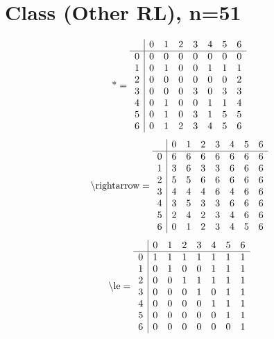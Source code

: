 \documentclass[11pt]{article}
\begin{document}
\section{Class (Other RL), n=51}
\[\text{*} = 
\begin{array}{r | r r r r r r r}
 & 0 & 1 & 2 & 3 & 4 & 5 & 6 \\ \hline
0 & 0 & 0 & 0 & 0 & 0 & 0 & 0 \\
1 & 0 & 1 & 0 & 0 & 1 & 1 & 1 \\
2 & 0 & 0 & 0 & 0 & 0 & 0 & 2 \\
3 & 0 & 0 & 0 & 3 & 0 & 3 & 3 \\
4 & 0 & 1 & 0 & 0 & 1 & 1 & 4 \\
5 & 0 & 1 & 0 & 3 & 1 & 5 & 5 \\
6 & 0 & 1 & 2 & 3 & 4 & 5 & 6 \\
\end{array}
\]
\[\text{\textbackslash rightarrow} = 
\begin{array}{r | r r r r r r r}
 & 0 & 1 & 2 & 3 & 4 & 5 & 6 \\ \hline
0 & 6 & 6 & 6 & 6 & 6 & 6 & 6 \\
1 & 3 & 6 & 3 & 3 & 6 & 6 & 6 \\
2 & 5 & 5 & 6 & 6 & 6 & 6 & 6 \\
3 & 4 & 4 & 4 & 6 & 4 & 6 & 6 \\
4 & 3 & 5 & 3 & 3 & 6 & 6 & 6 \\
5 & 2 & 4 & 2 & 3 & 4 & 6 & 6 \\
6 & 0 & 1 & 2 & 3 & 4 & 5 & 6 \\
\end{array}
\]
\[\text{\textbackslash le} = 
\begin{array}{r | r r r r r r r}
 & 0 & 1 & 2 & 3 & 4 & 5 & 6 \\ \hline
0 & 1 & 1 & 1 & 1 & 1 & 1 & 1 \\
1 & 0 & 1 & 0 & 0 & 1 & 1 & 1 \\
2 & 0 & 0 & 1 & 1 & 1 & 1 & 1 \\
3 & 0 & 0 & 0 & 1 & 0 & 1 & 1 \\
4 & 0 & 0 & 0 & 0 & 1 & 1 & 1 \\
5 & 0 & 0 & 0 & 0 & 0 & 1 & 1 \\
6 & 0 & 0 & 0 & 0 & 0 & 0 & 1 \\
\end{array}
\]
\end{document}
